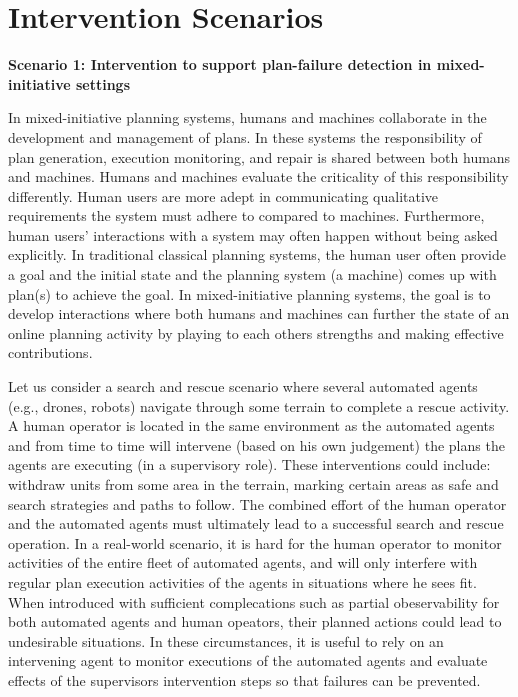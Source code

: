 \section{Intervention Scenarios}
\textbf{Scenario 1: Intervention to support plan-failure detection in mixed-initiative settings}

In mixed-initiative planning systems, humans and machines collaborate in the development and management of plans. In these systems the responsibility of plan generation, execution monitoring, and repair is shared between both humans and machines. Humans and machines evaluate the criticality of this responsibility differently. Human users are more adept in communicating qualitative requirements the system must adhere to compared to machines. Furthermore, human users' interactions with a system may often happen without being asked explicitly. In traditional classical planning systems, the human user often provide a goal and the initial state and the planning system (a machine) comes up with plan(s) to achieve the goal. In mixed-initiative planning systems, the goal is to develop interactions where both humans and machines can further the state of an online planning activity by playing to each others strengths and making effective contributions.

Let us consider a search and rescue scenario where several automated agents (e.g., drones, robots) navigate through some terrain to complete a rescue activity. A human operator is located in the same environment as the automated agents and from time to time will intervene (based on his own judgement) the plans the agents are executing (in a supervisory role). These interventions could include: withdraw units from some area in the terrain, marking certain areas as safe and search strategies and paths to follow.  The combined effort of the human operator and the automated agents must ultimately lead to a successful search and rescue operation. In a real-world scenario, it is hard for the human operator to monitor activities of the entire fleet of automated agents, and will only interfere with regular plan execution activities of the agents in situations where he sees fit. When introduced with sufficient complecations such as partial obeservability for both automated agents and human opeators, their planned actions could lead to undesirable situations. In these circumstances, it is useful to rely on an intervening agent to monitor executions of the automated agents and evaluate effects of the supervisors intervention steps so that failures can be prevented.

